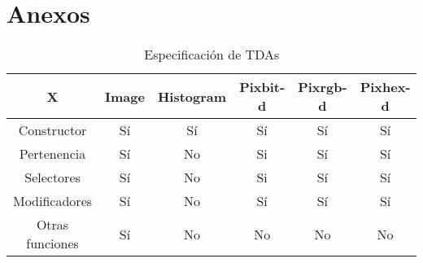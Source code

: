\section*{Anexos}

\begin{table}[H]
    \begin{center}
    \begin{tabular}{| c | c | c | c | c | c | }
    \hline
    X & Image & Histogram & Pixbit-d & Pixrgb-d & Pixhex-d \\ \hline
    Constructor & Sí & Sí & Sí & Sí & Sí \\
    Pertenencia & Sí & No & Si & Sí & Sí \\
    Selectores & Sí & No & Si & Sí & Sí \\
    Modificadores & Sí & No & Sí & Sí & Sí \\
    Otras funciones & Sí & No & No & No & No \\ \hline
    \end{tabular}
    \caption{Especificación de TDAs}
    \label{tab:TDAs}
    \end{center}
\end{table}


